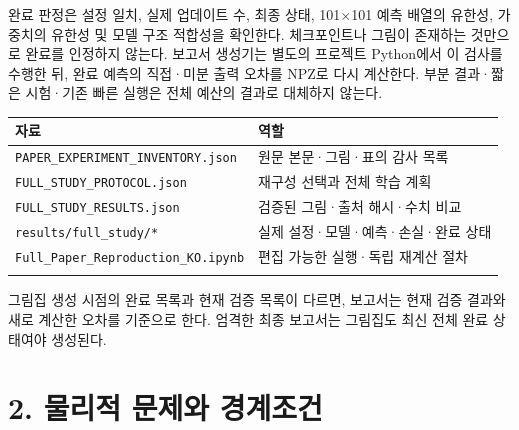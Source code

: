 \documentclass[10pt,a4paper]{article}
\begin{document}
완료 판정은 설정 일치, 실제 업데이트 수, 최종 상태, 101$\times$101 예측 배열의 유한성, 가중치의 유한성 및 모델 구조 적합성을 확인한다. 체크포인트나 그림이 존재하는 것만으로 완료를 인정하지 않는다. 보고서 생성기는 별도의 프로젝트 Python에서 이 검사를 수행한 뒤, 완료 예측의 직접·미분 출력 오차를 NPZ로 다시 계산한다. 부분 결과·짧은 시험·기존 빠른 실행은 전체 예산의 결과로 대체하지 않는다.\par

\begingroup\small

\par\begin{minipage}{\linewidth}\begin{tabular}{>{\raggedright\arraybackslash}p{}>{\raggedright\arraybackslash}p{}}

\rowcolor{tint} \textbf{자료} & \textbf{역할}\\\midrule

\nolinkurl{PAPER_EXPERIMENT_INVENTORY.json} & 원문 본문·그림·표의 감사 목록\\\addlinespace[2pt]

\nolinkurl{FULL_STUDY_PROTOCOL.json} & 재구성 선택과 전체 학습 계획\\\addlinespace[2pt]

\nolinkurl{FULL_STUDY_RESULTS.json} & 검증된 그림·출처 해시·수치 비교\\\addlinespace[2pt]

\nolinkurl{results/full_study/*} & 실제 설정·모델·예측·손실·완료 상태\\\addlinespace[2pt]

\nolinkurl{Full_Paper_Reproduction_KO.ipynb} & 편집 가능한 실행·독립 재계산 절차\\\addlinespace[2pt]

\bottomrule\end{tabular}\end{minipage}\par\vspace{5pt}\endgroup

{\small\color{muted} 그림집 생성 시점의 완료 목록과 현재 검증 목록이 다르면, 보고서는 현재 검증 결과와 새로 계산한 오차를 기준으로 한다. 엄격한 최종 보고서는 그림집도 최신 전체 완료 상태여야 생성된다.\par}

\clearpage

\section{2. 물리적 문제와 경계조건}
\end{document}
